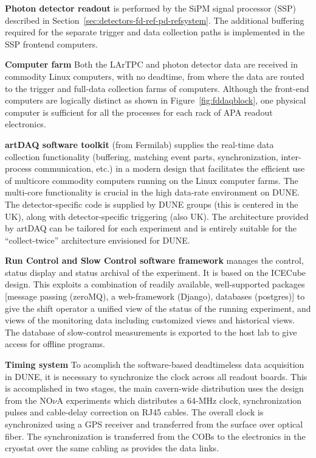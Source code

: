 {\bf Photon detector readout} is performed by the SiPM signal
processor (SSP) described in
Section~\ref{sec:detectors-fd-ref-pd-refsystem}.  The additional
buffering required for the separate trigger and data collection paths
is implemented in the SSP frontend computers.

{\bf Computer farm} Both the LArTPC and photon detector data are
received in commodity Linux computers, with no deadtime, from where
the data are routed to the trigger and full-data collection farms of
computers.  Although the front-end computers are logically distinct as
shown in Figure~\ref{fig:fddaqblock}, one physical computer is
sufficient for all the processes for each rack of APA readout
electronics. 

{\bf artDAQ software toolkit} (from Fermilab) supplies the real-time
data collection functionality (buffering, matching event parts,
synchronization, inter-process communication, etc.) in a modern
design that facilitates the efficient use of multicore commodity
computers running on the Linux computer farms.  The multi-core
functionality is crucial in the high data-rate environment on DUNE.  
The detector-specific
code is supplied by DUNE groups (this is centered in the UK), along
with detector-specific triggering (also UK).  The architecture
provided by artDAQ can be tailored for each experiment and is entirely
suitable for the ``collect-twice'' architecture envisioned for DUNE.

{\bf Run Control and Slow Control software framework} manages the
control, status display and status archival of the experiment.  It is
based on the ICECube design.  This
exploits a combination of readily available, well-supported packages
[message passing (zeroMQ), a web-framework (Django), databases (postgres)] 
to give the shift operator a unified view of the status
of the running experiment, and views of the monitoring data including
customized views and historical views.  The database of slow-control
measurements is exported to the host lab to give access for offline
programs.

{\bf Timing system} To acomplish the software-based deadtimeless data
acquisition in DUNE, it is necessary to synchronize the clock across
all readout boards.  This is accomplished in two stages, the main
cavern-wide distribution uses the design from the NO$\nu$A experiments
which distributes a 64-MHz clock, synchronization pulses and
cable-delay correction on RJ45 cables.  The overall clock is
synchronized using a GPS receiver and transferred from the surface
over optical fiber.  The synchronization is transferred from the COBs
to the electronics in the cryostat over the same cabling as provides
the data links.


